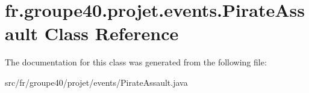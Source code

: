 \hypertarget{classfr_1_1groupe40_1_1projet_1_1events_1_1_pirate_assault}{}\section{fr.\+groupe40.\+projet.\+events.\+Pirate\+Assault Class Reference}
\label{classfr_1_1groupe40_1_1projet_1_1events_1_1_pirate_assault}


The documentation for this class was generated from the following file\+:\begin{DoxyCompactItemize}
\item 
src/fr/groupe40/projet/events/Pirate\+Assault.\+java\end{DoxyCompactItemize}
